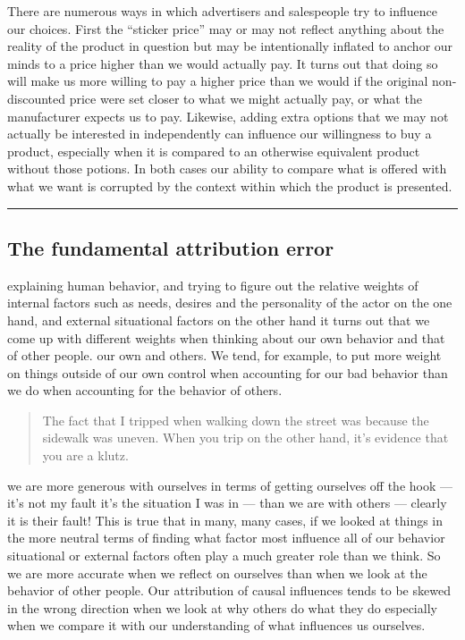 \documentclass[justified]{tufte-book}
\newenvironment{argument}{\begin{quote}\normalsize}{\end{quote}}
\begin{document}
There are numerous ways in which advertisers and salespeople try to influence our choices. First the ``sticker price'' may or may not reflect anything about the reality of the product in question but may be intentionally inflated to anchor our minds to a price higher than we would actually pay. It turns out that doing so will make us more willing to pay a higher price than we would if the original non-discounted price were set closer to what we might actually pay, or what the manufacturer expects us to pay. Likewise, adding extra options that we may not actually be interested in independently can influence our willingness to buy a product, especially when it is compared to an otherwise equivalent product without those potions. In both cases our ability to compare what is offered with what we want is corrupted by the context within which the product is presented.

\begin{center}\rule{0.5\linewidth}{\linethickness}\end{center}

\hypertarget{the-fundamental-attribution-error}{%
\subsection*{The fundamental attribution error}\label{the-fundamental-attribution-error}}

 explaining human behavior, and trying to figure out the relative weights of internal factors such as needs, desires and the personality of the actor on the one hand, and external situational factors on the other hand it turns out that we come up with different weights when thinking about our own behavior and that of other people. our own and others. We tend, for example, to put more weight on things outside of our own control when accounting for our bad behavior than we do when accounting for the behavior of others.

\begin{argument}
The fact that I tripped when walking down the street was because the
sidewalk was uneven. When you trip on the other hand, it's evidence that
you are a klutz.
\end{argument}

 we are more generous with ourselves in terms of getting ourselves off the hook --- it's not my fault it's the situation I was in --- than we are with others --- clearly it is their fault! This is true that in many, many cases, if we looked at things in the more neutral terms of finding what factor most influence all of our behavior situational or external factors often play a much greater role than we think. So we are more accurate when we reflect on ourselves than when we look at the behavior of other people. Our attribution of causal influences tends to be skewed in the wrong direction when we look at why others do what they do especially when we compare it with our understanding of what influences us ourselves.
\end{document}
